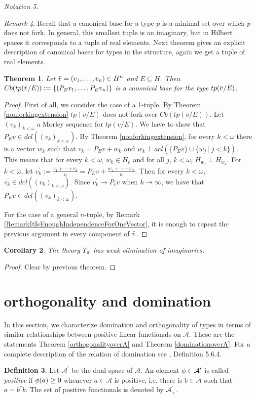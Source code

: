 \documentclass{amsart}
\def\bco{\begin{coro}}\def\eco{\end{coro}}
\def\bpf{\begin{proof}}\def\epf{\end{proof}}
\def\A{\mathcal{A}}
\newtheorem{theo}{Theorem}[section]
\newtheorem{coro}[theo]{Corollary}
\theoremstyle{definition}
\newtheorem{defin}[theo]{Definition}
\theoremstyle{remark}
\newtheorem{rem}[theo]{Remark}
\newtheorem{nota}[theo]{Notation}
\begin{document}
\begin{nota}
\begin{rem}
Recall that a canonical base for a type $p$ is a minimal set over which $p$ does not fork. In general, this smallest tuple is an imaginary, but in Hilbert spaces  it corresponds to a tuple of real elements. Next theorem gives an explicit description of canonical bases for types in the structure, again we get a tuple of real elements.
\begin{theo}\label{canonicalbase}
Let $\bar v=(v_1,\dots,v_n)\in H^n$ and $E\subseteq H$. Then $Cb(tp(\bar v/E)):=\{(P_Ev_1,\dots,P_Ev_n)\}$ is a canonical base for the type $tp(\bar v/E)$.
\end{theo}
\begin{proof}
First of all, we consider the case of a 1-tuple. By Theorem \ref{nonforkingextension} $tp(v/E)$ does not fork over $Cb(tp(v/E))$. Let $(v_k)_{k<\omega}$ a Morley sequence for $tp(v/E)$. We have to show that $P_Ev\in dcl((v_k)_{k<\omega})$. By Theorem \ref{nonforkingextension}, for every $k<\omega$ there is a vector $w_k$ such that $v_k=P_Ev+w_k$ and $w_k\perp acl(\{P_Ev\}\cup\{w_j\ |\ j< k\})$. This means that for every $k<\omega$, $w_k\in H_e$ and for all $j$, $k<\omega$, $H_{w_j}\perp H_{w_k}$. For $k<\omega$, let $v^\prime_k:=\frac{v_1+\cdots+v_k}{n}=P_Ev+\frac{w_1+\cdots+w_k}{n}$. Then for every $k<\omega$, $v^\prime_k\in dcl((v_k)_{k<\omega})$. Since $v^\prime_k\to P_ev$ when $k\to\infty$, we have that $P_Ev\in dcl((v_k)_{k<\omega})$.

For the case of a general $n$-tuple, by Remark \ref{RemarkItIsEnoughIndependenceForOneVector}, it is enough to repeat the previous argument in every component of $\bar v$.
\end{proof}

\bco
The theory $T_\pi$ has weak elimination of imaginaries.
\eco
\bpf
Clear by previous theorem.
\epf



\section{orthogonality and domination}\label{OrthogonalityAndDominationOfTypes}
In this section, we characterize domination and orthogonality of types in terms of similar relationships between positive linear functionals on $\A$. These are the statements Theorem \ref{orthogonalityoverA} and Theorem \ref{dominationoverA}. For a complete description of the relation of domination see \cite{Bue}, Definition 5.6.4.

\begin{defin}
Let $\A^\prime$ be the dual space of $\A$. An element $\f\in\A^\prime$ is called \textit{positive} if $\phi(a)\geq 0$ whenever $a\in\A$ is positive, i.e. there is $b\in\A$ such that $a=b^*b$. The set of positive functionals is denoted by $\A^\prime_+$.
\end{defin}


\end{rem}
\end{nota}
\end{document}
